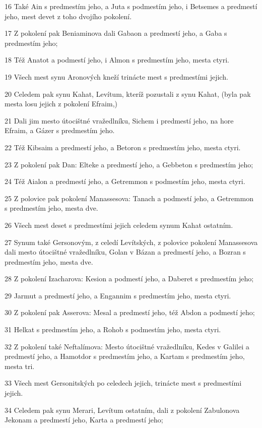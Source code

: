 \par 16 Také Ain s predmestím jeho, a Juta s podmestím jeho, i Betsemes a predmestí jeho, mest devet z toho dvojího pokolení.
\par 17 Z pokolení pak Beniaminova dali Gabaon a predmestí jeho, a Gaba s predmestím jeho;
\par 18 Též Anatot a podmestí jeho, i Almon s predmestím jeho, mesta ctyri.
\par 19 Všech mest synu Aronových kneží trinácte mest s predmestími jejich.
\par 20 Celedem pak synu Kahat, Levítum, kteríž pozustali z synu Kahat, (byla pak mesta losu jejich z pokolení Efraim,)
\par 21 Dali jim mesto útocištné vražedlníku, Sichem i predmestí jeho, na hore Efraim, a Gázer s predmestím jeho.
\par 22 Též Kibsaim a predmestí jeho, a Betoron s predmestím jeho, mesta ctyri.
\par 23 Z pokolení pak Dan: Elteke a predmestí jeho, a Gebbeton s predmestím jeho;
\par 24 Též Aialon a predmestí jeho, a Getremmon s podmestím jeho, mesta ctyri.
\par 25 Z polovice pak pokolení Manassesova: Tanach a podmestí jeho, a Getremmon s predmestím jeho, mesta dve.
\par 26 Všech mest deset s predmestími jejich celedem synum Kahat ostatním.
\par 27 Synum také Gersonovým, z celedí Levítských, z polovice pokolení Manassesova dali mesto útocištné vražedlníku, Golan v Bázan a predmestí jeho, a Bozran s predmestím jeho, mesta dve.
\par 28 Z pokolení Izacharova: Kesion a podmestí jeho, a Daberet s predmestím jeho;
\par 29 Jarmut a predmestí jeho, a Engannim s predmestím jeho, mesta ctyri.
\par 30 Z pokolení pak Asserova: Mesal a predmestí jeho, též Abdon a podmestí jeho;
\par 31 Helkat s predmestím jeho, a Rohob s podmestím jeho, mesta ctyri.
\par 32 Z pokolení také Neftalímova: Mesto útocištné vražedlníku, Kedes v Galilei a predmestí jeho, a Hamotdor s predmestím jeho, a Kartam s predmestím jeho, mesta tri.
\par 33 Všech mest Gersonitských po celedech jejich, trinácte mest s predmestími jejich.
\par 34 Celedem pak synu Merari, Levítum ostatním, dali z pokolení Zabulonova Jekonam a predmestí jeho, Karta a predmestí jeho;
